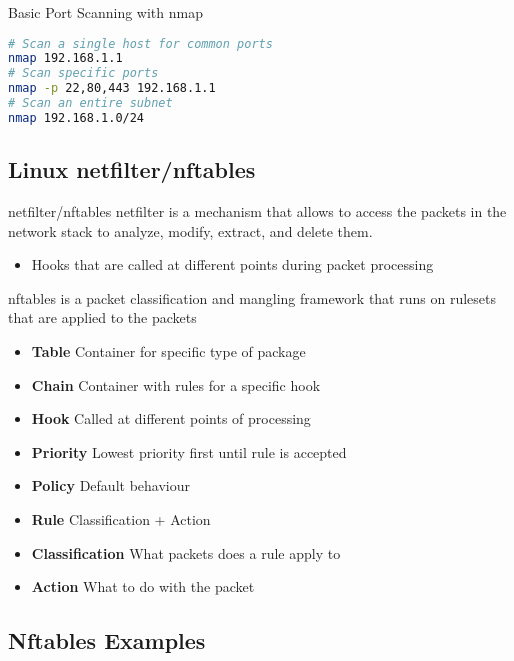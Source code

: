 \begin{examplecode}{Basic Port Scanning with nmap}
\begin{lstlisting}[language=bash, style=basesmol]
# Scan a single host for common ports
nmap 192.168.1.1
# Scan specific ports
nmap -p 22,80,443 192.168.1.1
# Scan an entire subnet
nmap 192.168.1.0/24
\end{lstlisting}
\end{examplecode}



\subsection{Linux netfilter/nftables}

\begin{definition}{netfilter/nftables}
    netfilter is a mechanism that allows to access the packets in the network stack to analyze, modify, extract, and delete them.
    \begin{itemize}
        \item Hooks that are called at different points during packet processing
    \end{itemize}
    
    nftables is a packet classification and mangling framework that runs on rulesets that are applied to the packets
    \begin{itemize}
        \item \textbf{Table} Container for specific type of package
        \item \textbf{Chain} Container with rules for a specific hook
        \item \textbf{Hook} Called at different points of processing
        \item \textbf{Priority} Lowest priority first until rule is accepted
        \item \textbf{Policy} Default behaviour
        \item \textbf{Rule} Classification + Action
        \item \textbf{Classification} What packets does a rule apply to
        \item \textbf{Action} What to do with the packet
    \end{itemize}
\end{definition}



\subsection{Nftables Examples}

